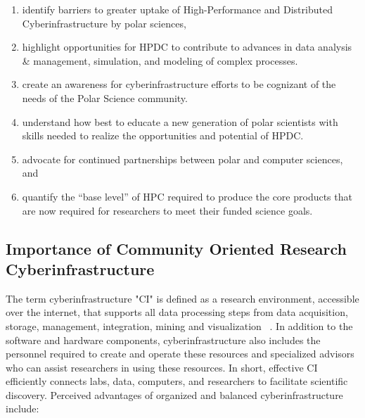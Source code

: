 \documentclass[10pt,letterpaper,draft]{article}
\begin{document}
 
\begin{enumerate}[label=\roman*., itemsep=0pt, topsep=0pt]

\item identify barriers to greater uptake of High-Performance and Distributed Cyberinfrastructure by polar sciences,

\item highlight opportunities for HPDC to contribute to advances in data analysis \& management, simulation, and modeling of complex processes.

\item create an awareness for cyberinfrastructure efforts to be cognizant of the needs of the Polar Science community.

\item understand how best to educate a new generation of polar scientists with skills needed to realize the opportunities and potential of HPDC.

\item advocate for continued partnerships between polar and computer sciences, and

\item quantify the “base level” of HPC required to produce the core products that are now required for researchers to meet their funded science goals.

\end{enumerate}

\subsection*{Importance of Community Oriented Research Cyberinfrastructure}

The term cyberinfrastructure "CI" is defined as a research environment, accessible over the internet, that supports all data processing steps from data acquisition, storage, management, integration, mining and visualization ~\cite{HackHolyoke_2016}. In addition to the software and hardware components, cyberinfrastructure also includes the personnel required to create and operate these resources and specialized advisors who can assist researchers in using these resources. In short, effective CI efficiently connects labs, data, computers, and researchers to facilitate scientific discovery. Perceived advantages of organized and balanced cyberinfrastructure include:
\end{document}

